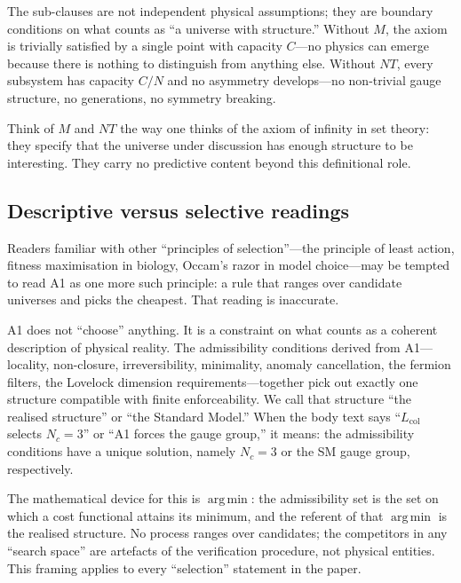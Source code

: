 \documentclass[11pt]{article}
\DeclareMathOperator*{\argmin}{arg\,min}
\begin{document}
The sub-clauses are not independent physical assumptions; they are boundary conditions on what counts as ``a universe with structure.''  Without $M$, the axiom is trivially satisfied by a single point with capacity $C$---no physics can emerge because there is nothing to distinguish from anything else.  Without $NT$, every subsystem has capacity $C/N$ and no asymmetry develops---no non-trivial gauge structure, no generations, no symmetry breaking.

Think of $M$ and $NT$ the way one thinks of the axiom of infinity in set theory: they specify that the universe under discussion has enough structure to be interesting.  They carry no predictive content beyond this definitional role.


\subsection{Descriptive versus selective readings}
\label{sec:descriptive_framing}

\begin{tcolorbox}[apfbox, title={Descriptive versus selective readings (reading convention)}]
\noindent Readers familiar with other ``principles of selection''---the principle of least action, fitness maximisation in biology, Occam's razor in model choice---may be tempted to read A1 as one more such principle: a rule that ranges over candidate universes and picks the cheapest.  That reading is inaccurate.

\smallskip
\noindent A1 does not ``choose'' anything.  It is a constraint on what counts as a coherent description of physical reality.  The admissibility conditions derived from A1---locality, non-closure, irreversibility, minimality, anomaly cancellation, the fermion filters, the Lovelock dimension requirements---together pick out exactly one structure compatible with finite enforceability.  We call that structure ``the realised structure'' or ``the Standard Model.''  When the body text says ``$L_{\mathrm{col}}$ selects $N_c = 3$'' or ``A1 forces the gauge group,'' it means: the admissibility conditions have a unique solution, namely $N_c = 3$ or the SM gauge group, respectively.

\smallskip
\noindent The mathematical device for this is $\argmin$: the admissibility set is the set on which a cost functional attains its minimum, and the referent of that $\argmin$ is the realised structure.  No process ranges over candidates; the competitors in any ``search space'' are artefacts of the verification procedure, not physical entities.  This framing applies to every ``selection'' statement in the paper.
\end{tcolorbox}
\end{document}

